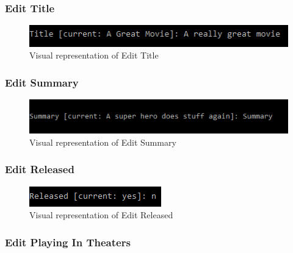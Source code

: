 \documentclass[
  english,
  a4paper,
,tablecaptionabove
]{scrartcl}
\begin{document}
\newpage

\hypertarget{edit-title}{%
\subsubsection{Edit Title}\label{edit-title}}

\begin{figure}
\centering
\includegraphics{images/ui-screenshots/update-title.png}
\caption{Visual representation of Edit Title}
\end{figure}

\newpage

\hypertarget{edit-summary}{%
\subsubsection{Edit Summary}\label{edit-summary}}

\begin{figure}
\centering
\includegraphics{images/ui-screenshots/update-summary.png}
\caption{Visual representation of Edit Summary}
\end{figure}

\newpage

\hypertarget{edit-released}{%
\subsubsection{Edit Released}\label{edit-released}}

\begin{figure}
\centering
\includegraphics{images/ui-screenshots/update-released.png}
\caption{Visual representation of Edit Released}
\end{figure}

\newpage

\hypertarget{edit-playing-in-theaters}{%
\subsubsection{Edit Playing In
Theaters}\label{edit-playing-in-theaters}}
\end{document}
